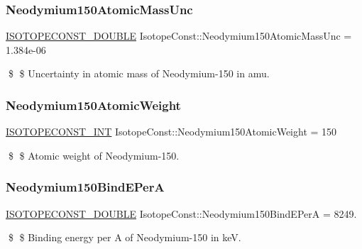 \subsubsection{\texorpdfstring{Neodymium150\+Atomic\+Mass\+Unc}{Neodymium150AtomicMassUnc}}
{\footnotesize\ttfamily \mbox{\hyperlink{group___isotope_const-_macros_ga8f45a7272ce02c0b4c65c44636ed719a}{I\+S\+O\+T\+O\+P\+E\+C\+O\+N\+S\+T\+\_\+\+D\+O\+U\+B\+LE}} Isotope\+Const\+::\+Neodymium150\+Atomic\+Mass\+Unc = 1.\+384e-\/06}

\$ \$ Uncertainty in atomic mass of Neodymium-\/150 in amu. \mbox{\label{group___isotope_const-_neodymium-_nd150_ga90afddf35c4158f1c18e631bd577515c}} 
\subsubsection{\texorpdfstring{Neodymium150\+Atomic\+Weight}{Neodymium150AtomicWeight}}
{\footnotesize\ttfamily \mbox{\hyperlink{group___isotope_const-_macros_ga5f18360b3e99483a35c32d789e62621c}{I\+S\+O\+T\+O\+P\+E\+C\+O\+N\+S\+T\+\_\+\+I\+NT}} Isotope\+Const\+::\+Neodymium150\+Atomic\+Weight = 150}

\$ \$ Atomic weight of Neodymium-\/150. \mbox{\label{group___isotope_const-_neodymium-_nd150_gac8c68279099cea3790edfd41d62b10d5}} 
\subsubsection{\texorpdfstring{Neodymium150\+Bind\+E\+PerA}{Neodymium150BindEPerA}}
{\footnotesize\ttfamily \mbox{\hyperlink{group___isotope_const-_macros_ga8f45a7272ce02c0b4c65c44636ed719a}{I\+S\+O\+T\+O\+P\+E\+C\+O\+N\+S\+T\+\_\+\+D\+O\+U\+B\+LE}} Isotope\+Const\+::\+Neodymium150\+Bind\+E\+PerA = 8249.}

\$ \$ Binding energy per A of Neodymium-\/150 in keV. \mbox{\label{group___isotope_const-_neodymium-_nd150_ga7c9aa05e5e50e7ea691e5c3bccbdbec8}} 

